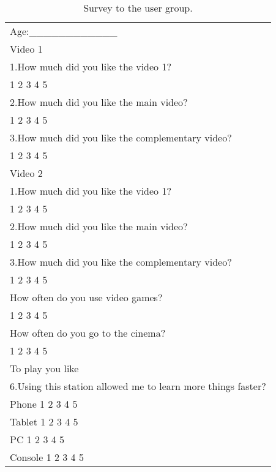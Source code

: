 \begin{table}
\small
\centering
\captionsetup{font=footnotesize}
\caption{Survey to the user group.}
\label{tab:users2} 

\small
\begin{tabular}{p{12cm}}
\hline\noalign{\smallskip} 
Age:\_\_\_\_\_\_\_\_\_\_\_\_ \\
Video 1 \\
\noalign{\smallskip}\hline\noalign{\smallskip}\hline
\small{1.How much did you like the video 1? } \\ 
\small{	1			2			3			4			5	}\\\hline
\small{2.How much did you like the main video? }  \\ 
\small{	1			2			3			4			5	}\\\hline
\small{3.How much did you like the complementary video?  } \\ 
\small{	1			2			3			4			5	}\\\hline
\hline\noalign{\smallskip} 
Video 2 \\
\noalign{\smallskip}\hline\noalign{\smallskip}\hline
\small{1.How much did you like the video 1? } \\ 
\small{	1			2			3			4			5	}\\\hline
\small{2.How much did you like the main video? }  \\ 
\small{	1			2			3			4			5	}\\\hline
\small{3.How much did you like the complementary video?  } \\
\small{	1			2			3			4			5	}\\\hline 
\hline\noalign{\smallskip} 

\small{How often do you use video games?   } \\ 
\small{	1			2			3			4			5	}\\\hline
\small{How often do you go to the cinema? } \\ 
\small{	1			2			3			4			5	}\\\hline
\hline\noalign{\smallskip} 
To play you like \\
\noalign{\smallskip}\hline\noalign{\smallskip}\hline
\small{6.Using this station allowed me to learn more things faster? }  \\ 
\small{	Phone 	1			2			3			4			5	}\\\hline
\small{	Tablet 	1			2			3			4			5	}\\\hline
\small{	PC	 	1			2			3			4			5	}\\\hline
\small{	Console		1			2			3			4			5	}\\\hline


\end{tabular}
\end{table}
